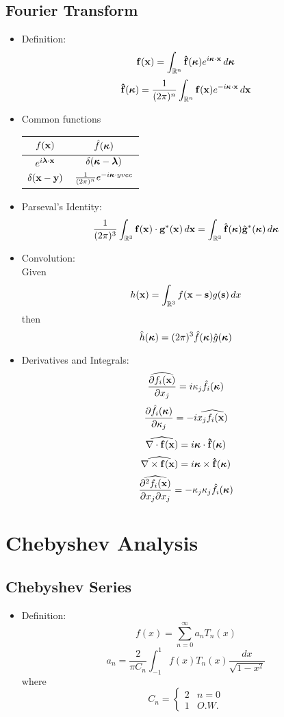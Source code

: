 \documentclass[oneside,a4paper,11pt]{article}
\newcommand{\fhvec}{\mathbf{\hat{f}}}
\begin{document}
\subsection{Fourier Transform}
\begin{itemize}
\item Definition:
\[\fvec(\xvec) = \int_{\Rn} \fhvec(\kvec)e^{i\kvec \cdot \xvec} \,d\kvec \]
\[\fhvec(\kvec) = \frac{1}{(2\pi)^n}\int_{\Rn} \fvec(\xvec)e^{-i\kvec \cdot \xvec} \,d\xvec\]

\item Common functions
\begin{center}
\begin{tabular}{|c|c|}
\hline
$f(\mathbf{x})$ & $\hat{f}(\boldsymbol\kappa)$ \\
\hline
$e^ {i \boldsymbol{\lambda} \cdot \mathbf{x}}$ & $\delta(\boldsymbol\kappa - \boldsymbol{\lambda})$ \\
\hline
$\delta(\mathbf{x} - \mathbf{y})$ & $\frac{1}{(2\pi)^n}e^{- i \boldsymbol\kappa \cdot yvec} $ \\
\hline
\end{tabular}	
\end{center}

\item Parseval's Identity:
\[ \frac{1}{ ( 2 \pi )^3 } \int_{\mathbb{R}^3} \mathbf{f}(\mathbf{x}) \cdot \mathbf{g}^*(\mathbf{x}) \,d\mathbf{x} =  \int_{\mathbb{R}^3} \hat {\mathbf{f}}(\boldsymbol\kappa) \hat {\mathbf{g}}^*(\boldsymbol\kappa) \,d\boldsymbol\kappa \]

\item Convolution: \\
Given
\[ h( \mathbf{x} ) = \int_{{\mathbb{R}^3}} f( \mathbf{x} - \mathbf{s} )g( \mathbf{s} ) \, dx \]
then
\[\hat{h}(\boldsymbol\kappa) = (2\pi)^3 \hat{f}(\boldsymbol\kappa) \hat{g}(\boldsymbol\kappa) \]

\item Derivatives and Integrals:
\[ \widehat{\frac{\partial f_i(\mathbf{x})}{\partial x_j}} = i \kappa_j \hat f_i(\boldsymbol\kappa) \]
\[ \frac{\partial \hat{f}_i(\boldsymbol\kappa)}{\partial \kappa_j} = -i \widehat{x_jf_i(\mathbf{x})}\]
\[ \widehat{\nabla \cdot \fvec(\xvec)} = i \kvec \cdot \fhvec(\kvec) \]
\[ \widehat{\nabla \times \fvec(\xvec)} = i \kvec \times \fhvec(\kvec) \]
\[ \widehat{\frac{\partial^2 f_i(\mathbf{x})}{\partial x_j \partial x_j}} = - \kappa_j\kappa_j \hat{f}_i(\boldsymbol\kappa) \]
\end{itemize}

\section{Chebyshev Analysis}
\subsection{Chebyshev Series}
\begin{itemize}
\item Definition:
\[f(x)=\sum_{n=0}^{\infty}a_nT_n(x)\]
\[a_n=\frac{2}{\pi C_n}\int_{-1}^{1}f(x)T_n(x)\frac{dx}{\sqrt{1-x^2}}\]
where
\[ C_n = \left\{ \begin{array}{cc}  2 & n=0\\ 1 & O.W. \end{array}\right. \]
\end{itemize}
\end{document}
